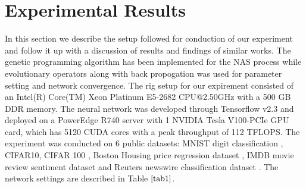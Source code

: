 \documentclass[conference]{IEEEtran}
\begin{document}
\section{Experimental Results}

In this section we describe the setup followed for conduction of our experiment and follow it up with a discussion of results and findings of similar works. The genetic programming algorithm has been implemented for the NAS process while evolutionary operators along with back propogation was used for parameter setting and network convergence. The rig setup for our expirement consisted of an Intel(R) Core(TM) Xeon Platinum E5-2682 CPU@2.50GHz with a 500 GB DDR memory. The neural network was developed through Tensorflow v2.3 and deployed on a PowerEdge R740 server with 1 NVIDIA Tesla V100-PCIe GPU card, which has 5120 CUDA cores with a peak throughput of 112 TFLOPS. The experiment was conducted on 6 public datasets: MNIST digit classification \cite{mnist}, CIFAR10, CIFAR 100 \cite{cifar}, Boston Housing price regression dataset \cite{boston}, IMDB movie review sentiment dataset \cite{IMDB} and Reuters newswire classification dataset \cite{reuters}. The network settings are described in Table $\ref{tab1}$.
\end{document}
